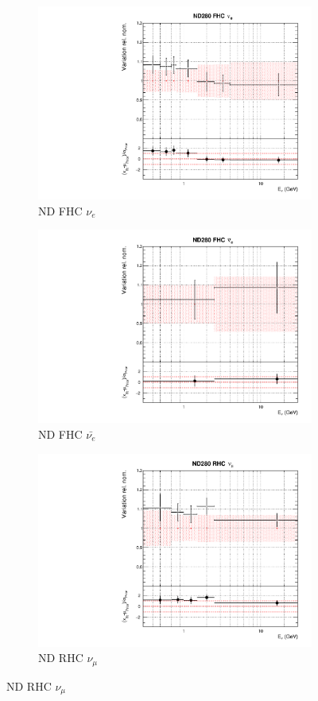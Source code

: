 \begin{figure}[!htbp]
\begin{subfigure}{0.45\textwidth}
  \centering
  \includegraphics[width=0.75\linewidth]{figs/datflux2}
  \caption{ND FHC $\nu_{e}$}
\end{subfigure}
\begin{subfigure}{0.45\textwidth}
  \centering
  \includegraphics[width=0.75\linewidth]{figs/datflux3}
  \caption{ND FHC $\bar{\nu_{e}}$}
\end{subfigure}
\begin{subfigure}{0.45\textwidth}
  \centering
  \includegraphics[width=0.75\linewidth]{figs/datflux4}
  \caption{ND RHC $\nu_{\mu}$}

\end{subfigure}
\end{figure}
